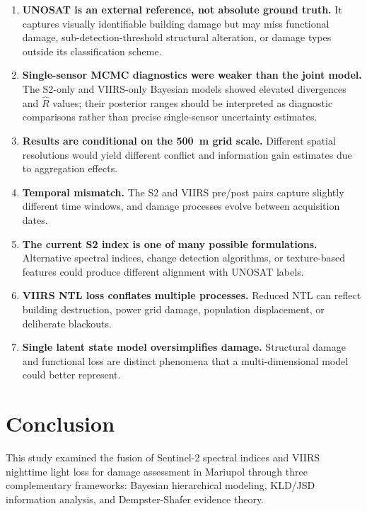 \documentclass[wcp]{jmlr}
\begin{document}
\begin{enumerate}
  \item \textbf{UNOSAT is an external reference, not absolute ground truth.}
    It captures visually identifiable building damage but may miss
    functional damage, sub-detection-threshold structural alteration, or
    damage types outside its classification scheme.
  \item \textbf{Single-sensor MCMC diagnostics were weaker than the joint
    model.} The S2-only and VIIRS-only Bayesian models showed elevated
    divergences and $\hat{R}$ values; their posterior ranges should be
    interpreted as diagnostic comparisons rather than precise single-sensor
    uncertainty estimates.
  \item \textbf{Results are conditional on the 500~m grid scale.} Different
    spatial resolutions would yield different conflict and information gain
    estimates due to aggregation effects.
  \item \textbf{Temporal mismatch.} The S2 and VIIRS pre/post pairs capture
    slightly different time windows, and damage processes evolve between
    acquisition dates.
  \item \textbf{The current S2 index is one of many possible formulations.}
    Alternative spectral indices, change detection algorithms, or
    texture-based features could produce different alignment with UNOSAT
    labels.
  \item \textbf{VIIRS NTL loss conflates multiple processes.} Reduced NTL
    can reflect building destruction, power grid damage, population
    displacement, or deliberate blackouts.
  \item \textbf{Single latent state model oversimplifies damage.} Structural
    damage and functional loss are distinct phenomena that a
    multi-dimensional model could better represent.
\end{enumerate}

\section{Conclusion}\label{sec:conclusion}

This study examined the fusion of Sentinel-2 spectral indices and VIIRS
nighttime light loss for damage assessment in Mariupol through three
complementary frameworks: Bayesian hierarchical modeling, KLD/JSD
information analysis, and Dempster-Shafer evidence theory.
\end{document}
